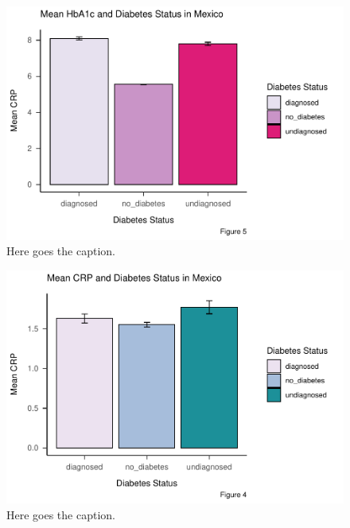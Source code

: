 \documentclass[
  man]{apa6}
\begin{document}
\begin{figure}
\centering
\includegraphics{NEW_Final_Groupof5_files/figure-latex/dshba1c-1.pdf}
\caption{\label{fig:dshba1c}Here goes the caption.}
\end{figure}



\begin{figure}
\centering
\includegraphics{NEW_Final_Groupof5_files/figure-latex/dscrp-1.pdf}
\caption{\label{fig:dscrp}Here goes the caption.}
\end{figure}
\end{document}
